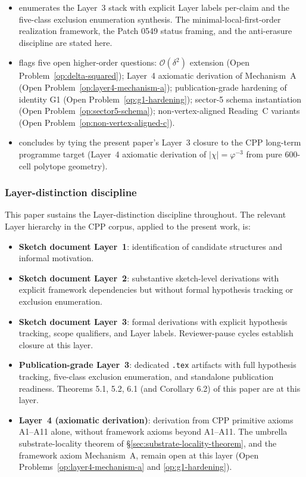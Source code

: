 \documentclass[11pt,letterpaper]{article}
\newcommand{\phig}{\varphi}
\newcommand{\bigO}[1]{\mathcal{O}(#1)}
\begin{document}
\begin{itemize}[leftmargin=2em]
\item[\S\ref{sec:layer3-stack}] enumerates the Layer~3 stack with explicit Layer labels per-claim and the five-class exclusion enumeration synthesis. The minimal-local-first-order realization framework, the Patch 0549 status framing, and the anti-erasure discipline are stated here.
\item[\S\ref{sec:open-questions}] flags five open higher-order questions: $\bigO{\delta^2}$ extension (Open Problem~\ref{op:delta-squared}); Layer~4 axiomatic derivation of Mechanism~A (Open Problem~\ref{op:layer4-mechanism-a}); publication-grade hardening of identity G1 (Open Problem~\ref{op:g1-hardening}); sector-5 schema instantiation (Open Problem~\ref{op:sector5-schema}); non-vertex-aligned Reading~C variants (Open Problem~\ref{op:non-vertex-aligned-c}).
\item[\S\ref{sec:conclusion}] concludes by tying the present paper's Layer~3 closure to the CPP long-term programme target (Layer~4 axiomatic derivation of $|\chi| = \phig^{-3}$ from pure 600-cell polytope geometry).
\end{itemize}

\subsubsection*{Layer-distinction discipline}

This paper sustains the Layer-distinction discipline throughout. The relevant Layer hierarchy in the CPP corpus, applied to the present work, is:
\begin{itemize}[leftmargin=2em]
\item \textbf{Sketch document Layer~1}: identification of candidate structures and informal motivation.
\item \textbf{Sketch document Layer~2}: substantive sketch-level derivations with explicit framework dependencies but without formal hypothesis tracking or exclusion enumeration.
\item \textbf{Sketch document Layer~3}: formal derivations with explicit hypothesis tracking, scope qualifiers, and Layer labels. Reviewer-pause cycles establish closure at this layer.
\item \textbf{Publication-grade Layer~3}: dedicated \texttt{.tex} artifacts with full hypothesis tracking, five-class exclusion enumeration, and standalone publication readiness. Theorems 5.1, 5.2, 6.1 (and Corollary 6.2) of this paper are at this layer.
\item \textbf{Layer~4 (axiomatic derivation)}: derivation from CPP primitive axioms A1--A11 alone, without framework axioms beyond A1--A11. The umbrella substrate-locality theorem of \S\ref{sec:substrate-locality-theorem}, and the framework axiom Mechanism~A, remain open at this layer (Open Problems~\ref{op:layer4-mechanism-a} and \ref{op:g1-hardening}).
\end{itemize}
\end{document}
